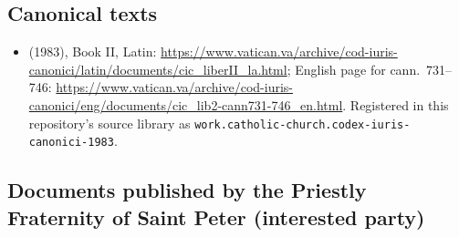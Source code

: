 \subsection*{Canonical texts}

\begin{itemize}
\item {} (1983), Book II, Latin:
\url{https://www.vatican.va/archive/cod-iuris-canonici/latin/documents/cic_liberII_la.html};
English page for cann.~731--746:
\url{https://www.vatican.va/archive/cod-iuris-canonici/eng/documents/cic_lib2-cann731-746_en.html}.
Registered in this repository's source library as
\texttt{work.catholic-church.codex-iuris-canonici-1983}.
\end{itemize}

\subsection*{Documents published by the Priestly Fraternity of Saint Peter
(interested party)}

